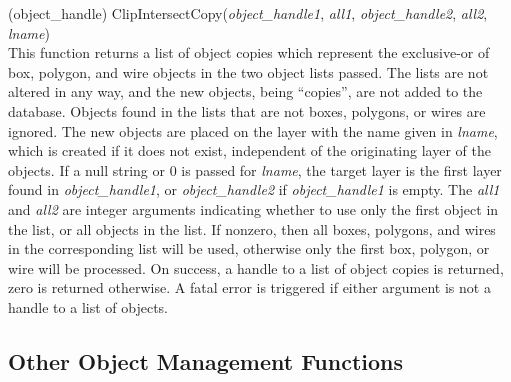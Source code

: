 \begin{description}
\item{(object\_handle) \vt ClipIntersectCopy({\it object\_handle1},
 {\it all1\/}, {\it object\_handle2}, {\it all2\/}, {\it lname})}\\
This function returns a list of object copies which represent the
exclusive-or of box, polygon, and wire objects in the two object lists
passed.  The lists are not altered in any way, and the new objects,
being ``copies'', are not added to the database.  Objects found in the
lists that are not boxes, polygons, or wires are ignored.  The new
objects are placed on the layer with the name given in {\it lname},
which is created if it does not exist, independent of the originating
layer of the objects.  If a null string or 0 is passed for {\it
lname}, the target layer is the first layer found in {\it
object\_handle1}, or {\it object\_handle2} if {\it object\_handle1} is
empty.  The {\it all1} and {\it all2} are integer arguments indicating
whether to use only the first object in the list, or all objects in
the list.  If nonzero, then all boxes, polygons, and wires in the
corresponding list will be used, otherwise only the first box,
polygon, or wire will be processed.  On success, a handle to a list of
object copies is returned, zero is returned otherwise.  A fatal error
is triggered if either argument is not a handle to a list of objects.

\end{description}


\subsection{Other Object Management Functions}

